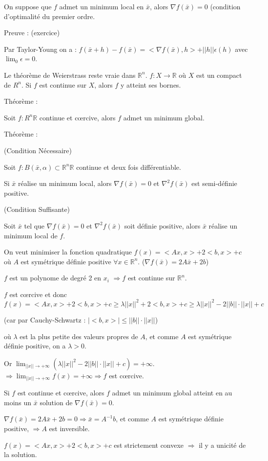 		On suppose que $f$ admet un minimum local en $\bar{x}$, alors $\nabla f(\bar{x}) = 0$ (condition d'optimalité du premier ordre.
		
		Preuve : (exercice)
		
		Par Taylor-Young on a : $f(\bar{x}+h)-f(\bar{x}) = < \nabla f(\bar{x}) ,h> + ||h|| \epsilon(h)$ avec $\lim_0 \epsilon = 0$.
		
		
		Le théorème de Weierstrass reste vraie dans $\mathbb{R}^n$.
		$f:X\rightarrow \mathbb{R}$ où $X$ est un compact de $R^n$.
		Si $f$ est continue sur $X$, alors $f$ y atteint ses bornes.
		
		Théorème : 
		
		Soit $f:R^n \mathbb{R}$ continue et c\oe rcive, alors $f$ admet un minimum global.
		
		Théorème : 
		
		(Condition Nécessaire)
		
		Soit $f : B(\bar{x}, \alpha) \subset \mathbb{R}^n \mathbb{R}$ continue et deux fois différentiable.
		
		Si $\bar{x}$ réalise un minimum local, alors $\nabla f(\bar{x}) = 0$ et $\nabla^2 f(\bar{x})$ est semi-définie positive.
		
		(Condition Suffisante)
		
		Soit $\bar{x}$ tel que $\nabla f(\bar{x}) = 0$ et $\nabla^2 f(\bar{x})$ soit définie positive, alors $\bar{x}$ réalise un minimum local de $f$.
		
		\begin{ex}
		
		On veut minimiser la fonction quadratique $f(x) = <Ax, x> +2<b, x> +c$ où $A$ est symétrique définie positive $\forall x \in \mathbb{R}^n$.
		($\nabla f(\bar{x}) = 2A\bar{x} +2b$)
		
		$f$ est un polynome de degré 2 en $x_i$ $\Rightarrow f$ est continue sur $\mathbb{R}^n$.
		
		$f$ est c\oe rcive et donc 
	 	$ f(x) = <Ax, x>  +2<b, x> +c \geq \lambda ||x||^2 + 2<b, x> +c \geq \lambda ||x||^2 - 2||b|| \cdot ||x|| +c $
		
		(car par Cauchy-Schwartz : $|<b, x>| \leq ||b|| \cdot ||x||$)
		
		où $\lambda$ est la plus petite des valeurs propres de $A$, et comme $A$ est symétrique définie positive, on a $\lambda >0$.
		
		Or $\displaystyle \lim_{||x|| \rightarrow +\infty}( \lambda ||x||^2 -2||b|| \cdot ||x|| +c) = +\infty$.
		$\displaystyle \Rightarrow \lim_{||x|| \rightarrow +\infty}f(x) = +\infty \Rightarrow f$ est c\oe rcive.
		
		Si $f$ est continue et c\oe rcive, alors $f$ admet un minimum global atteint en au moins un $\bar{x}$ solution de $\nabla f(\bar{x}) = 0$.
		
		$\nabla f(\bar{x}) = 2A\bar{x} +2b = 0 \Rightarrow \bar{x} = A^{-1} b$, et comme $A$ est symétrique définie positive, $\Rightarrow A$ est inversible.
		
		$f(x) = <Ax, x> +2<b, x> +c$ est strictement convexe $\Rightarrow$ il y a unicité de la solution.
		
		\end{ex}
		
